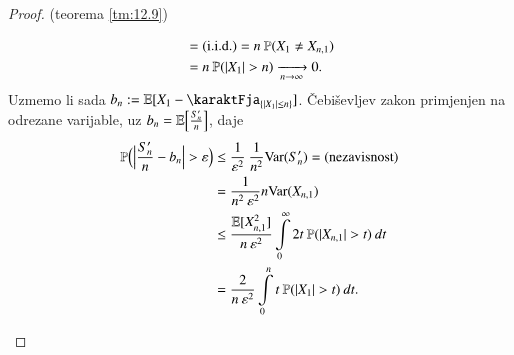 \begin{proof}{(teorema \ref{tm:12.9})}
\begin{itemize}
\begin{equation*}
\begin{aligned}
                &= (\mathrm{i.i.d.}) = n \: \mathbb{P}({X_1 \neq X_{n, 1}})\\
                &= n \: \mathbb{P}({|X_1| > n}) \xrightarrow[n \to \infty]{} 0.
            \end{aligned}
        \end{equation*}
        Uzmemo li sada $b_n := \masE [X_1 - \karaktFja_{\{ |X_1| \leq n \}}] $.
        \v Cebi\v sevljev zakon primjenjen na odrezane varijable, uz $b_n = \mathbb{E} \Big[ \frac{S_n'}{n} \Big]$, daje
        \begin{equation*}
            \begin{aligned}
                \mathbb{P} \Big( \Big| \frac{S_n'}{n} - b_n \Big| > \varepsilon \Big) &\leq \frac{1}{\varepsilon^2} \: \frac{1}{n^2} \mathrm{Var} (S_n') = (\textnormal{nezavisnost})\\
                &= \frac{1}{n^2 \: \varepsilon^2} n \mathrm{Var} (X_{n, 1})\\
                &\leq \frac{\mathbb{E} [ X_{n, 1}^2 ]}{n \: \varepsilon^2} \int\limits_0^{\infty} 2 t \: \mathbb{P}({|X_{n, 1}| > t}) \: dt\\
                &= \frac{2}{n \: \varepsilon^2} \int\limits_0^n t \: \mathbb{P}({|X_1| > t}) \: dt.
            \end{aligned}
        \end{equation*}


\end{itemize}
\end{proof}
